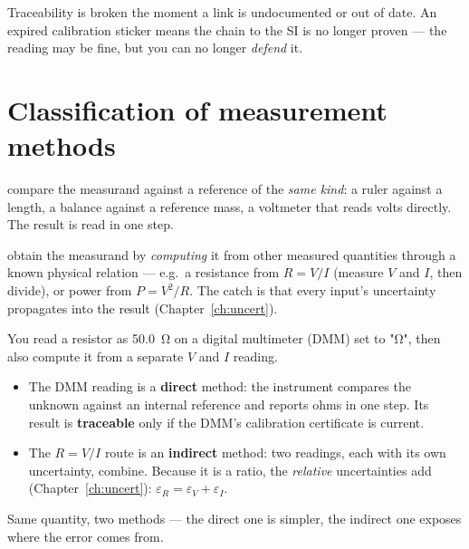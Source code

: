 \documentclass[11pt,a4paper,oneside]{book}
\begin{document}
\begin{warning}
Traceability is broken the moment a link is undocumented or out of date. An
expired calibration sticker means the chain to the SI is no longer proven --- the
reading may be fine, but you can no longer \emph{defend} it.
\end{warning}

\section{Classification of measurement methods}\label{sec:methods}

\begin{description}[leftmargin=0pt,style=nextline]
  \item[Direct methods] compare the measurand against a reference of the
        \emph{same kind}: a ruler against a length, a balance against a reference
        mass, a voltmeter that reads volts directly. The result is read in one
        step.
  \item[Indirect methods] obtain the measurand by \emph{computing} it from other
        measured quantities through a known physical relation --- e.g.\ a
        resistance from $R=V/I$ (measure $V$ and $I$, then divide), or power from
        $P=V^2/R$. The catch is that every input's uncertainty propagates into the
        result (Chapter~\ref{ch:uncert}).
\end{description}

\begin{wexample}
You read a resistor as \qty{50.0}{\ohm} on a digital multimeter (DMM) set to
"\si{\ohm}", then also compute it from a separate $V$ and $I$ reading.
\begin{itemize}[leftmargin=1.2cm,itemsep=1pt]
  \item The DMM reading is a \textbf{direct} method: the instrument compares the
        unknown against an internal reference and reports ohms in one step. Its
        result is \textbf{traceable} only if the DMM's calibration certificate is
        current.
  \item The $R=V/I$ route is an \textbf{indirect} method: two readings, each with
        its own uncertainty, combine. Because it is a ratio, the \emph{relative}
        uncertainties add (Chapter~\ref{ch:uncert}):
        $\varepsilon_R=\varepsilon_V+\varepsilon_I$.
\end{itemize}
Same quantity, two methods --- the direct one is simpler, the indirect one exposes
where the error comes from.
\end{wexample}
\end{document}
